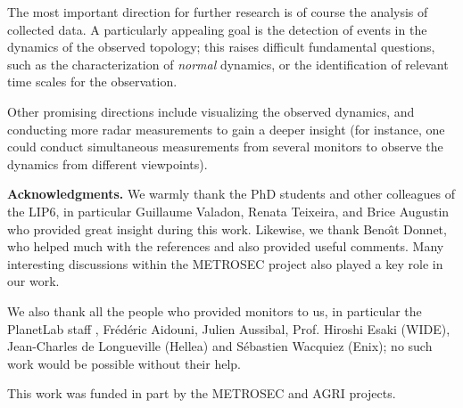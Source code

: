 \documentclass[times, 10pt,twocolumn]{article}
\begin{document}
The most important direction for further research is of course the
analysis of collected data.
A particularly appealing goal is the detection of events
in the dynamics of the observed topology;
this raises difficult fundamental questions,
such as the characterization of {\em normal} dynamics,
or the identification of relevant time scales for the observation.

Other promising directions include visualizing the observed
dynamics,
and conducting more radar measurements to gain a deeper insight
(for instance, one could conduct simultaneous
measurements from several monitors to observe the dynamics from
different viewpoints).








\bigskip
\noindent
{\bf Acknowledgments.}
We warmly thank the PhD students and other colleagues of the LIP6, in particular Guillaume Valadon, Renata Teixeira,
and Brice Augustin who provided great insight during this work.
Likewise, we thank Beno\^\i t Donnet, who helped much with the references and also provided useful comments. Many interesting
discussions within the METROSEC project \cite{metrosecurl} also played a key role in our work.

We also thank all the people who provided monitors to us, in particular the PlanetLab staff \cite{planetLab}, Fr\'ed\'eric Aidouni,
Julien Aussibal, Prof. Hiroshi Esaki (WIDE), Jean-Charles de Longueville (Hellea) and S\'ebastien Wacquiez (Enix);
no such work would be possible without their help.

This work was funded in part by the METROSEC and AGRI projects.




\end{document}

